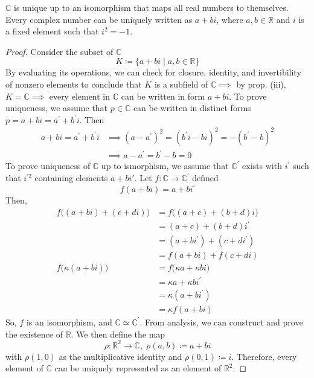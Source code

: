   \begin{theorem}
    \label{thm:uniqueness-of-c}
    $\mathbb{C}$ is unique up to an isomorphism that maps all real numbers to themselves. Every complex number can be uniquely written as $a + bi$, where $a, b \in \mathbb{R}$ and $i$ is a fixed element such that $i^2 = -1$. 
  \end{theorem}
  \begin{proof}
    Consider the subset of $\mathbb{C}$
    \begin{equation}
      K \coloneqq \{ a + bi \; | \; a, b \in \mathbb{R}\}
    \end{equation}
    By evaluating its operations, we can check for closure, identity, and invertibility of nonzero elements to conclude that $K$ is a subfield of $\mathbb{C} \implies$ by prop. (iii), $K = \mathbb{C} \implies$ every element in $\mathbb{C}$ can be written in form $a + bi$. To prove uniqueness, we assume that $p \in \mathbb{C}$ can be written in distinct forms $p = a + bi = a^{\prime} + b^\prime i$. Then
    \begin{align*}
       a + bi = a^{\prime} + b^\prime i & \implies (a - a^\prime)^2 = (b^\prime i - b i)^2 = - (b^\prime - b)^2 \\
       & \implies a - a^\prime = b^\prime - b = 0
    \end{align*}
    To prove uniqueness of $\mathbb{C}$ up to ismorphism, we assume that $\mathbb{C}^\prime$ exists with $i^\prime$ such that $i^{\prime 2}$ containing elements $a + b i'$. Let $f: \mathbb{C} \to \mathbb{C}^\prime$ defined 
    \begin{equation}
      f( a + bi) = a + bi^\prime
    \end{equation}
    Then, 
    \begin{align*}
      f\big((a + b i) + (c + d i) \big) & = f\big( (a + c) + (b + d)i \big) \\
      & = (a + c) + (b + d) i^\prime \\
      & = (a + b i^\prime) + (c + d i^\prime) \\
      & = f(a + b i) + f( c + d i) \\
      f\big( \kappa (a + b i)\big) & = f\big( \kappa a + \kappa b i\big) \\
      & = \kappa a + \kappa b i^\prime \\
      & = \kappa (a + b i^\prime) \\
      & = \kappa f(a + b i)
    \end{align*}
    So, $f$ is an isomorphism, and $\mathbb{C} \simeq \mathbb{C}^\prime$. From analysis, we can construct and prove the existence of $\mathbb{R}$. We then define the map
    \begin{equation}
      \rho: \mathbb{R}^2 \to \mathbb{C}, \; \rho(a, b) \coloneqq a + bi
    \end{equation}
    with $\rho(1, 0)$ as the multiplicative identity and $\rho(0,1) \coloneqq i$. Therefore, every element of $\mathbb{C}$ can be uniquely represented as an element of $\mathbb{R}^2$. 
  \end{proof}

